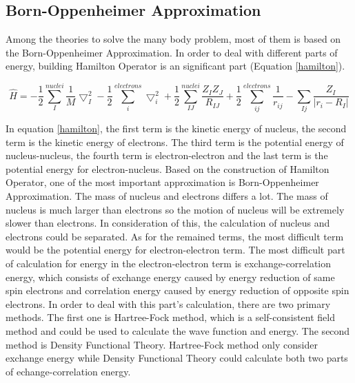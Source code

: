 \documentclass[letterpaper,12pt]{article}
\begin{document}
\subsection{Born-Oppenheimer Approximation}
Among the theories to solve the many body problem, most of them is based on the Born-Oppenheimer Approximation\cite{born1927quantentheorie}. In order to deal with different parts of energy, building Hamilton Operator is an significant part (Equation \ref{hamilton}).

\begin{equation} \label{hamilton}
\hat{H} = -\frac{1}{2} \sum_{I}^{nuclei} \frac{1}{M} \bigtriangledown_{I}^{2} - \frac{1}{2} \sum_{i}^{electrons}\bigtriangledown_{i}^{2} + \frac{1}{2}\sum_{IJ}^{nuclei}\frac{Z_{I}Z_{J}}{R_{IJ}} + \frac{1}{2}\sum_{ij}^{electrons}\frac{1}{r_{ij}}-\sum_{Ij}^{ }\frac{Z_{I}}{\left | r_{i}- R_{I} \right |}
\end{equation}

\par In equation \ref{hamilton}, the first term is the kinetic energy of nucleus, the second term is the kinetic energy of electrons. The third term is the potential energy of nucleus-nucleus, the fourth term is electron-electron and the last term is the potential energy for electron-nucleus. Based on the construction of Hamilton Operator, one of the most important approximation is Born-Oppenheimer Approximation\cite{born1927quantentheorie}. The mass of nucleus and electrons differs a lot. The mass of nucleus is much larger than electrons so the motion of nucleus will be extremely slower than electrons. In consideration of this, the calculation of nucleus and electrons could be separated. As for the remained terms, the most difficult term would be the potential energy for electron-electron term. The most difficult part of calculation for energy in the electron-electron term is exchange-correlation energy\cite{jones2006introduction}, which consists of exchange energy caused by energy reduction of same spin electrons and correlation energy caused by energy reduction of opposite spin electrons. In order to deal with this part's calculation, there are two primary methods. The first one is Hartree-Fock method\cite{fischer1987general}, which is a self-consistent field method and could be used to calculate the wave function and energy. The second method is Density Functional Theory\cite{gross2013density}. Hartree-Fock method only consider exchange energy while Density Functional Theory could  calculate both two parts of echange-correlation energy.
\end{document}
